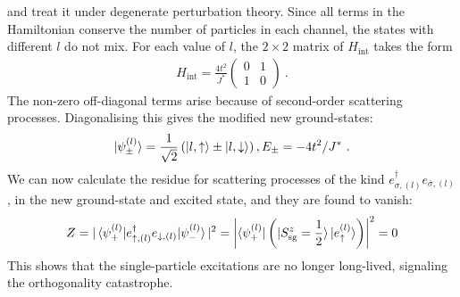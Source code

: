 \documentclass[12pt]{iopart}
\begin{document}
and treat it under degenerate perturbation theory. Since all terms in the Hamiltonian conserve the number of particles in each channel, the states with different \(l\) do not mix. For each value of \(l\), the \(2\times 2\) matrix of \(H_\text{int}\) takes the form
\begin{equation}\begin{aligned}
	H_\text{int} = \frac{4t^2}{J^*}\begin{pmatrix} 0 & 1 \\ 1 & 0 \end{pmatrix} ~.
\end{aligned}\end{equation}
The non-zero off-diagonal terms arise because of second-order scattering processes.
Diagonalising this gives the modified new ground-states:
\begin{equation}\begin{aligned}
	\ket{\psi_\pm^{(l)}} = \frac{1}{\sqrt 2}\left(\ket{l,\uparrow} \pm \ket{l,\downarrow}\right), E_\pm = -4t^2/J^*~.
\end{aligned}\end{equation}
We can now calculate the residue for scattering processes of the kind \(e^\dagger_{\sigma,(l)} e_{\bar\sigma,(l)}\), in the new ground-state and excited state, and they are found to vanish:
\begin{equation}\begin{aligned}
	Z = |\braket{\psi_+^{(l)}| e^\dagger_{\uparrow,(l)} e_{\downarrow,(l)} | \psi_-^{(l)}}|^2 = \left|\bra{\psi_+^{(l)}}\left(\ket{S_\text{sg}^z=\frac{1}{2}}\ket{e_\uparrow^{(l)}}\right)\right|^2 = 0
\end{aligned}\end{equation}
This shows that the single-particle excitations are no longer long-lived, signaling the orthogonality catastrophe.
\end{document}
